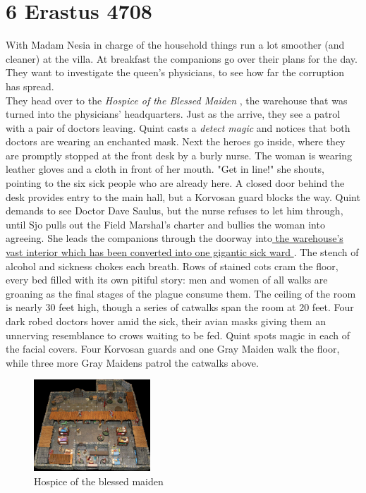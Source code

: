 \section{6 Erastus 4708}

With Madam Nesia in charge of the household things run a lot smoother (and cleaner) at the villa. At breakfast the companions go over their plans for the day. They want to investigate the queen's physicians, to see how far the corruption has spread.\\

They head over to the {\itshape Hospice of the Blessed Maiden} , the warehouse that was turned into the physicians' headquarters. Just as the arrive, they see a patrol with a pair of doctors leaving. Quint casts a  {\itshape detect magic} and notices that both doctors are wearing an enchanted mask. Next the heroes go inside, where they are promptly stopped at the front desk by a burly nurse. The woman is wearing leather gloves and a cloth in front of her mouth. "Get in line!" she shouts, pointing to the six sick people who are already here. A closed door behind the desk provides entry to the main hall, but a Korvosan guard blocks the way. Quint demands to see Doctor Dave Saulus, but the nurse refuses to let him through, until Sjo pulls out the Field Marshal's charter and bullies the woman into agreeing. She leads the companions through the doorway into\hyperref[fig:Hospice-of-the-blessed-maiden-515716825]{ the warehouse's vast interior which has been converted into one gigantic sick ward } . The stench of alcohol and sickness chokes each breath. Rows of stained cots cram the floor, every bed filled with its own pitiful story: men and women of all walks are groaning as the final stages of the plague consume them. The ceiling of the room is nearly 30 feet high, though a series of catwalks span the room at 20 feet. Four dark robed doctors hover amid the sick, their avian masks giving them an unnerving resemblance to crows waiting to be fed. Quint spots magic in each of the facial covers. Four Korvosan guards and one Gray Maiden walk the floor, while three more Gray Maidens patrol the catwalks above. \\

\begin{figure}[h]
	\centering
	\includegraphics[width=0.39\textwidth]{images/Hospice-of-the-blessed-maiden-515716825.jpg}
	\caption{Hospice of the blessed maiden}
	\label{fig:Hospice-of-the-blessed-maiden-515716825}
\end{figure}

